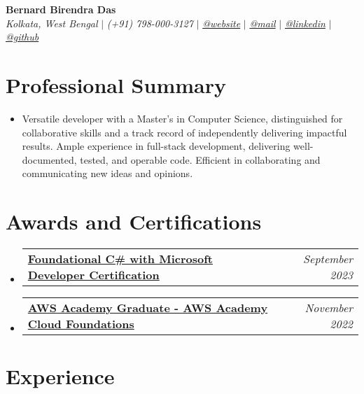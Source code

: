 \documentclass[letterpaper,10pt]{article}
\makeatletter
\newcommand{\sectionspace}{\vspace{-20pt}}
\newcommand{\subheadingtitlevspace}{\vspace{-3pt}}
\newcommand{\titleItem}[1]{\textbf{#1}}
\newcommand{\resumeProjectHeading}[2]{
    \item
    \begin{tabular*}{0.97\textwidth}{l@{\extracolsep{\fill}}r}
        #1 & \textit{ #2} \\
    \end{tabular*}\vspace{-9pt}
}
\newcommand{\resumeSubHeadingListStart}{\subheadingtitlevspace\begin{itemize}[leftmargin=0.15in, label={}]}
\newcommand{\resumeSubHeadingListEnd}{\end{itemize}}
\makeatother
\begin{document}
\begin{flushleft}
    \textbf{\huge Bernard Birendra Das} \\
    \textit{Kolkata, West Bengal} $|$
    \textit{(+91) 798-000-3127} $|$
    \href{https://berniespace.dev}{{\textit{@website}}} $|$
    \href{mailto:bernardbdas@gmail.com}{{\textit{@mail}}} $|$
    \href{https://linkedin.com/in/bernardbdas}{{\textit{@linkedin}}} $|$
    \href{https://github.com/bernardbdas}{{\textit{@github}}}
    \vspace{-8pt}
\end{flushleft}

\section{Professional Summary}
\vspace{-3pt}
\begin{itemize}[leftmargin=0.15in, label={}]
    \item{Versatile developer with a Master's in Computer Science, distinguished for collaborative skills and a track record of independently delivering impactful results. Ample experience in full-stack development, delivering well-documented, tested, and operable code. Efficient in collaborating and communicating new ideas and opinions.}
\end{itemize}
\sectionspace

\section{Awards and Certifications}
    \resumeSubHeadingListStart
        \resumeProjectHeading{\href{https://www.freecodecamp.org/certification/bernardbdas/foundational-c-sharp-with-microsoft}{\titleItem{Foundational C\# with Microsoft Developer Certification}}}{September 2023}
        \resumeProjectHeading{\href{https://www.credly.com/badges/bdf2f146-b8c1-4cc0-b3df-81980f4df784}{\titleItem{AWS Academy Graduate - AWS Academy Cloud Foundations}}}{November 2022}
    \resumeSubHeadingListEnd



% 
% 

\section{Experience}
\end{document}
